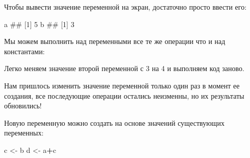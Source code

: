 \documentclass[]{book}
\newenvironment{Shaded}{\begin{snugshade}}{\end{snugshade}}
\newcommand{\DecValTok}[1]{\textcolor[rgb]{0.00,0.00,0.81}{#1}}
\newcommand{\StringTok}[1]{\textcolor[rgb]{0.31,0.60,0.02}{#1}}
\newcommand{\OperatorTok}[1]{\textcolor[rgb]{0.81,0.36,0.00}{\textbf{#1}}}
\newcommand{\NormalTok}[1]{#1}
\begin{document}
Чтобы вывести значение переменной на экран, достаточно просто ввести
его:

\begin{Shaded}
\begin{Highlighting}[]
\NormalTok{a}
\NormalTok{## [1] 5}
\NormalTok{b}
\NormalTok{## [1] 3}
\end{Highlighting}
\end{Shaded}

Мы можем выполнить над переменными все те же операции что и над
константами:

\begin{Shaded}
\end{Shaded}

Легко меняем значение второй переменной с 3 на 4 и выполняем код заново.

\begin{Shaded}
\end{Shaded}

Нам пришлось изменить значение переменной только один раз в момент ее
создания, все последующие операции остались неизменны, но их результаты
обновились!

Новую переменную можно создать на основе значений существующих
переменных:

\begin{Shaded}
\begin{Highlighting}[]
\NormalTok{c <-}\StringTok{ }\NormalTok{b}
\NormalTok{d <-}\StringTok{ }\NormalTok{a}\OperatorTok{+}\NormalTok{c}
\end{Highlighting}
\end{Shaded}
\end{document}
